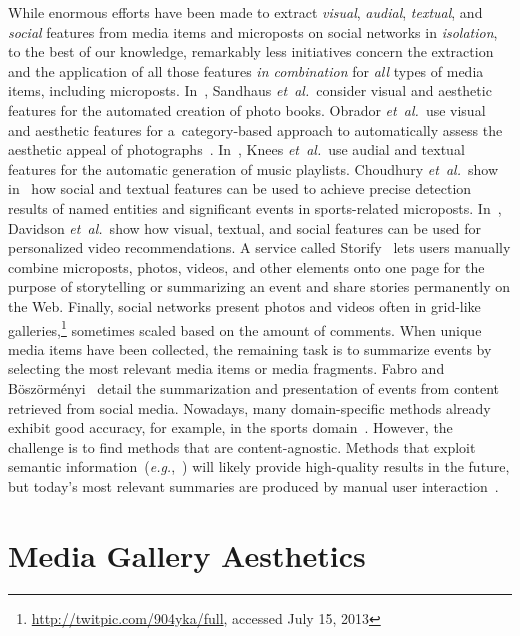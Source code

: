 While enormous efforts have been made to extract
\emph{visual}, \emph{audial},
\emph{textual}, and \emph{social} features
from media items and microposts on social networks in \emph{isolation},
to the best of our knowledge, remarkably less initiatives
concern the extraction and the application
of all those features \emph{in combination}
for \emph{all} types of media items, including microposts.
In~\cite{sandhaus2011photobook}, Sandhaus \emph{et~al.}\ consider visual and
aesthetic features for the automated creation of photo books.
Obrador \emph{et~al.}\ use visual and aesthetic features
for a~category-based approach to automatically assess
the aesthetic appeal of photographs~\cite{obrador2012photoaesthetics}.
In~\cite{knees2006musicplaylist}, Knees \emph{et~al.}\ use audial and textual
features for the automatic generation of music playlists.
Choudhury \emph{et~al.}\ show in~\cite{choudhury2011sportstweets} how social and textual
features can be used to achieve precise detection results
of named entities and significant events in sports-related microposts.
In~\cite{davidson2010videorecommendation}, Davidson \emph{et~al.}\ show how visual,
textual, and social features can be used for personalized video recommendations.
A service called Storify~\cite{fincham2011storify} lets users manually combine
microposts, photos, videos, and other elements onto one page for the purpose
of storytelling or summarizing an event
and share stories permanently on the Web.
Finally, social networks present photos and videos
often in grid-like galleries,\footnote{\url{http://twitpic.com/904yka/full}, accessed July 15, 2013}
sometimes scaled based on the amount of comments.
When unique media items have been collected,
the remaining task is to summarize events by selecting the most relevant media items or media fragments.
Fabro and B\"osz\"orm\'enyi~\cite{delfabro2012summarization} detail
the summarization and presentation of events from content retrieved from social media.
Nowadays, many domain-specific methods already exhibit good accuracy,
for example, in the sports domain~\cite{li2001sportsvideo,li2010americanfootball}. However, the challenge is to find methods that are content-agnostic.
Methods that exploit semantic information~(\emph{e.g.},~\cite{chen2009videosummarization})
will likely provide high-quality results in the future,
but today's most relevant summaries are produced by
manual user interaction~\cite{olsen2011videosummarization}.

\section{Media Gallery Aesthetics}

